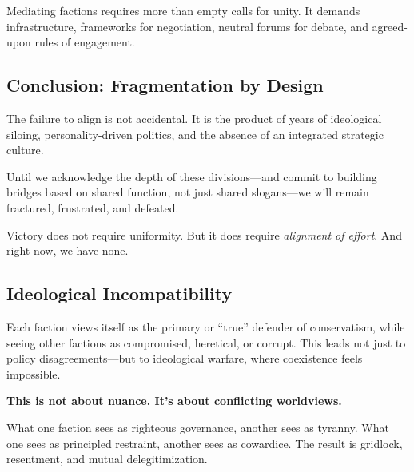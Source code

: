 Mediating factions requires more than empty calls for unity. It demands infrastructure, frameworks for negotiation, neutral forums for debate, and agreed-upon rules of engagement.

\subsection{Conclusion: Fragmentation by Design}
The failure to align is not accidental. It is the product of years of ideological siloing, personality-driven politics, and the absence of an integrated strategic culture.

Until we acknowledge the depth of these divisions—and commit to building bridges based on shared function, not just shared slogans—we will remain fractured, frustrated, and defeated.

Victory does not require uniformity. But it does require \textit{alignment of effort}. And right now, we have none.

\subsection{Ideological Incompatibility}

Each faction views itself as the primary or “true” defender of conservatism, while seeing other factions as compromised, heretical, or corrupt. This leads not just to policy disagreements—but to ideological warfare, where coexistence feels impossible.

\textbf{This is not about nuance. It’s about conflicting worldviews.}\newline

What one faction sees as righteous governance, another sees as tyranny. What one sees as principled restraint, another sees as cowardice. The result is gridlock, resentment, and mutual delegitimization.

